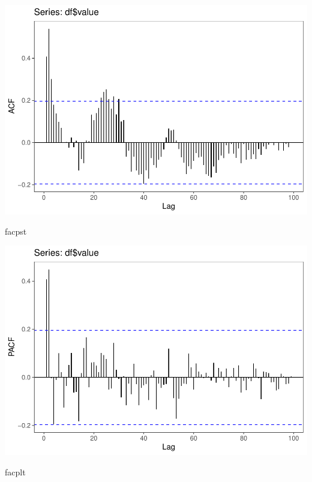 \documentclass[11pt, a4paper]{report}
\newenvironment{Shaded}{\begin{snugshade}}{\end{snugshade}}
\newcommand{\NormalTok}[1]{#1}
\theoremstyle{plain}
\theoremstyle{plain}
\theoremstyle{remark}
\begin{document}
\begin{center}\includegraphics{Econo2_P4_files/figure-latex/plots-4} \end{center}

\begin{Shaded}
	\begin{Highlighting}[]
		\NormalTok{facpst}
	\end{Highlighting}
\end{Shaded}

\begin{center}\includegraphics{Econo2_P4_files/figure-latex/plots-5} \end{center}

\begin{Shaded}
	\begin{Highlighting}[]
		\NormalTok{facplt}
	\end{Highlighting}
\end{Shaded}
\end{document}
